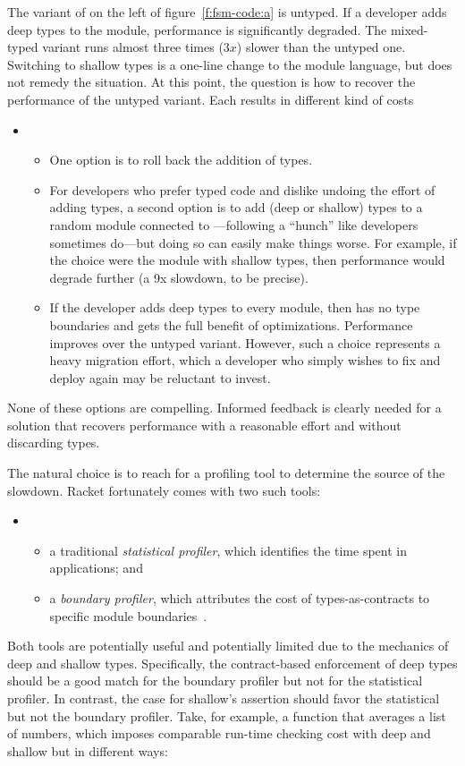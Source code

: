 The variant of  on the left of figure~\ref{f:fsm-code:a} is untyped.
If a developer adds deep types to the  module, performance is
significantly degraded. The mixed-typed variant runs almost three times
($3x$) slower than the untyped one.  Switching to shallow types is a one-line
change to the module language, but does not remedy the situation.
At this point, the question is how to recover the performance of the untyped
variant. Each results in different kind of costs  
\begin{itemize} \item[] \begin{itemize}
  \item
One option is to roll back the addition of types.
  \item
For developers who prefer typed code and dislike undoing the effort of
adding types, a second option is to add
(deep or shallow) types to a random module connected to ---following a
``hunch'' like developers sometimes do---but doing so can easily make things
worse. For example, if the choice were the  module with shallow
types, then performance would degrade further (a 9x slowdown, to be
precise).
  \item
If the developer adds deep types to every module, then 
has no type boundaries and gets the full benefit of optimizations. Performance
improves over the untyped variant.
However, such a choice
represents a heavy migration effort, which a developer who simply
wishes to fix  and deploy again may be reluctant to invest.
\end{itemize} \end{itemize}
None of these options are compelling.
Informed feedback is clearly needed for a solution that recovers performance
with a reasonable effort and without discarding types.

The natural choice is to reach for a
profiling tool to determine the source of the slowdown.
Racket fortunately comes with two such tools: 
\begin{itemize} \item[] \begin{itemize}

\item a traditional \emph{statistical profiler}, which identifies the time spent
 in applications; and

\item a \emph{boundary profiler}, which  attributes the cost of types-as-contracts to
 specific module boundaries~\cite{astavf-feature-prf, staaf-feature-prf}.

\end{itemize} \end{itemize}
Both tools are potentially useful and potentially limited due to the mechanics
of deep and shallow types. Specifically, the contract-based enforcement of
deep types should be a good match for the boundary profiler but not
for the statistical profiler. In contrast, the case for shallow's
assertion should favor the statistical but not the boundary profiler.
Take, for example, a function that averages a list of numbers, which
imposes comparable run-time checking cost with deep and shallow but in
different ways:

